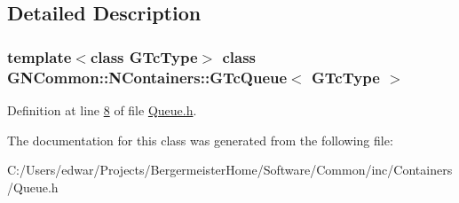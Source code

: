 \subsection{Detailed Description}
\subsubsection*{template$<$class G\+Tc\+Type$>$\newline
class G\+N\+Common\+::\+N\+Containers\+::\+G\+Tc\+Queue$<$ G\+Tc\+Type $>$}



Definition at line \mbox{\hyperlink{_queue_8h_source_l00008}{8}} of file \mbox{\hyperlink{_queue_8h_source}{Queue.\+h}}.



The documentation for this class was generated from the following file\+:\begin{DoxyCompactItemize}
\item 
C\+:/\+Users/edwar/\+Projects/\+Bergermeister\+Home/\+Software/\+Common/inc/\+Containers/Queue.\+h\end{DoxyCompactItemize}
